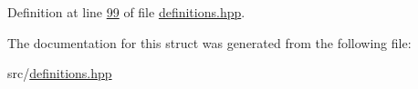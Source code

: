 Definition at line \hyperlink{definitions_8hpp_source_l00099}{99} of file \hyperlink{definitions_8hpp_source}{definitions.\+hpp}.



The documentation for this struct was generated from the following file\+:\begin{DoxyCompactItemize}
\item 
src/\hyperlink{definitions_8hpp}{definitions.\+hpp}\end{DoxyCompactItemize}
